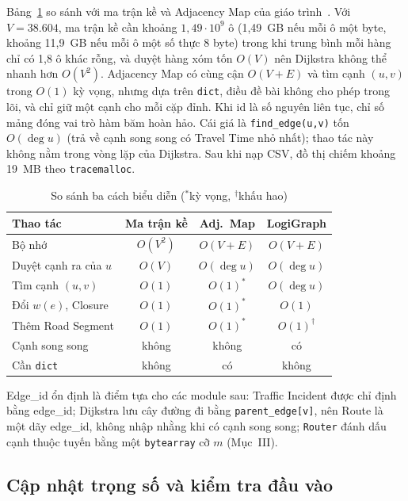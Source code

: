 Bảng~\ref{tab:repr} so sánh với ma trận kề và Adjacency Map của giáo trình~\cite{goodrich2013}. Với $V=38.604$, ma trận kề cần khoảng $1{,}49\cdot 10^{9}$ ô (1,49~GB nếu mỗi ô một byte, khoảng 11,9~GB nếu mỗi ô một số thực 8 byte) trong khi trung bình mỗi hàng chỉ có 1,8 ô khác rỗng, và duyệt hàng xóm tốn $O(V)$ nên Dijkstra không thể nhanh hơn $O(V^2)$. Adjacency Map có cùng cận $O(V+E)$ và tìm cạnh $(u,v)$ trong $O(1)$ kỳ vọng, nhưng dựa trên \texttt{dict}, điều đề bài không cho phép trong lõi, và chỉ giữ một cạnh cho mỗi cặp đỉnh. Khi id là số nguyên liên tục, chỉ số mảng đóng vai trò hàm băm hoàn hảo. Cái giá là \texttt{find\_edge(u,v)} tốn $O(\deg u)$ (trả về cạnh song song có Travel Time nhỏ nhất); thao tác này không nằm trong vòng lặp của Dijkstra. Sau khi nạp CSV, đồ thị chiếm khoảng 19~MB theo \texttt{tracemalloc}.

\begin{table}[t]
\centering
\caption{So sánh ba cách biểu diễn ($^{*}$kỳ vọng, $^{\dagger}$khấu hao)}
\label{tab:repr}
\begin{tabular}{@{}lccc@{}}
\toprule
Thao tác & Ma trận kề & Adj.\ Map & LogiGraph \\
\midrule
Bộ nhớ & $O(V^2)$ & $O(V+E)$ & $O(V+E)$ \\
Duyệt cạnh ra của $u$ & $O(V)$ & $O(\deg u)$ & $O(\deg u)$ \\
Tìm cạnh $(u,v)$ & $O(1)$ & $O(1)^{*}$ & $O(\deg u)$ \\
Đổi $w(e)$, Closure & $O(1)$ & $O(1)^{*}$ & $O(1)$ \\
Thêm Road Segment & $O(1)$ & $O(1)^{*}$ & $O(1)^{\dagger}$ \\
Cạnh song song & không & không & có \\
Cần \texttt{dict} & không & có & không \\
\bottomrule
\end{tabular}
\end{table}

Edge\_id ổn định là điểm tựa cho các module sau: Traffic Incident được chỉ định bằng edge\_id; Dijkstra lưu cây đường đi bằng \texttt{parent\_edge[v]}, nên Route là một dãy edge\_id, không nhập nhằng khi có cạnh song song; \texttt{Router} đánh dấu cạnh thuộc tuyến bằng một \texttt{bytearray} cỡ $m$ (Mục~III).

\subsection{Cập nhật trọng số và kiểm tra đầu vào}

